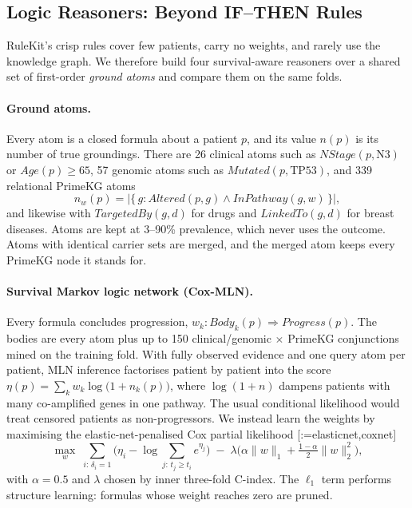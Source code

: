\documentclass{mnnit}
\makeatletter
\newcommand{\rc}[1]{[\def\rc@sep{}\@for\rc@key:=#1\do{\rc@sep\ref{ref:\rc@key}\def\rc@sep{, }}]}
\makeatother
\begin{document}
\subsection{Logic Reasoners: Beyond IF--THEN Rules}\label{sec:logic}
RuleKit's crisp rules cover few patients, carry no weights, and rarely use the knowledge graph. We therefore build
four survival-aware reasoners over a shared set of first-order \emph{ground atoms} and compare them on the same
folds.

\paragraph{Ground atoms.} Every atom is a closed formula about a patient $p$, and its value $n(p)$ is its number of
true groundings. There are 26 clinical atoms such as $\mathit{NStage}(p, \mathrm{N3})$ or
$\mathit{Age}(p) \ge 65$, 57 genomic atoms such as $\mathit{Mutated}(p, \mathrm{TP53})$, and 339 relational PrimeKG
atoms
\begin{equation}
  n_w(p) = \big|\{\, g : \mathit{Altered}(p,g) \wedge \mathit{InPathway}(g,w) \,\}\big|,
\end{equation}
and likewise with $\mathit{TargetedBy}(g,d)$ for drugs and $\mathit{LinkedTo}(g,d)$ for breast diseases. Atoms
are kept at 3--90\% prevalence, which never uses the outcome. Atoms with identical carrier sets are merged, and
the merged atom keeps every PrimeKG node it stands for.

\paragraph{Survival Markov logic network (Cox-MLN).} Every formula concludes progression,
$w_k : \mathit{Body}_k(p) \Rightarrow \mathit{Progress}(p)$. The bodies are every atom plus up to 150
clinical/genomic $\times$ PrimeKG conjunctions mined on the training fold. With fully observed evidence and one
query atom per patient, MLN inference factorises patient by patient into the score
$\eta(p) = \sum_k w_k \log\!\big(1 + n_k(p)\big)$, where $\log(1+n)$ dampens patients with many co-amplified genes in
one pathway. The usual conditional likelihood would treat censored patients as non-progressors. We instead learn the
weights by maximising the elastic-net-penalised Cox partial likelihood \rc{elasticnet,coxnet}
\begin{equation}
  \max_{w}\; \sum_{i:\,\delta_i = 1}\Big(\eta_i - \log\!\!\sum_{j:\,t_j \ge t_i}\! e^{\eta_j}\Big)
  \;-\; \lambda\Big(\alpha\|w\|_1 + \tfrac{1-\alpha}{2}\|w\|_2^2\Big),
\end{equation}
with $\alpha = 0.5$ and $\lambda$ chosen by inner three-fold C-index. The $\ell_1$ term performs structure
learning: formulas whose weight reaches zero are pruned.
\end{document}
